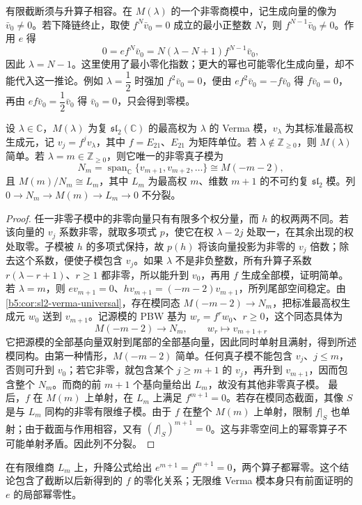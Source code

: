 \ProseParagraphBreak
有限截断须与升算子相容。在 \(M(\lambda)\) 的一个非零商模中，记生成向量的像为 \(\bar v_0\ne0\)。若下降链终止，取使 \(f^N\bar v_0=0\) 成立的最小正整数 \(N\)，则 \(f^{N-1}\bar v_0\ne0\)。作用 \(e\) 得
\[
	0=ef^N\bar v_0=N(\lambda-N+1)f^{N-1}\bar v_0,
\]
因此 \(\lambda=N-1\)。这里使用了最小零化指数；更大的幂也可能零化生成向量，却不能代入这一推论。例如 \(\lambda=\dfrac12\) 时强加 \(f^2\bar v_0=0\)，便由 \(ef^2\bar v_0=-f\bar v_0\) 得 \(f\bar v_0=0\)，再由 \(ef\bar v_0=\dfrac12\bar v_0\) 得 \(\bar v_0=0\)，只会得到零模。

\begin{theorem}\label{b5:thm:sl2-verma-submodules}
	设 \(\lambda\in\mathbb C\)，\(M(\lambda)\) 为复 \(\mathfrak{sl}_2(\mathbb C)\) 的最高权为 \(\lambda\) 的 Verma 模，\(v_\lambda\) 为其标准最高权生成元，记 \(v_j=f^jv_\lambda\)，其中 \(f=E_{21}\)、\(E_{21}\) 为矩阵单位。若 \(\lambda\notin\mathbb Z_{\ge0}\)，则 \(M(\lambda)\) 简单。若 \(\lambda=m\in\mathbb Z_{\ge0}\)，则它唯一的非零真子模为
	\[
		N_m=\operatorname{span}_{\mathbb C}\{v_{m+1},v_{m+2},\ldots\} \cong M(-m-2),
	\]
	且 \(M(m)/N_m\cong L_m\)，其中 \(L_m\) 为最高权 \(m\)、维数 \(m+1\) 的不可约复 \(\mathfrak{sl}_2\) 模。列 \(0\to N_m\to M(m)\to L_m\to0\) 不分裂。
\end{theorem}
\begin{proof}
	任一非零子模中的非零向量只有有限多个权分量，而 \(h\) 的权两两不同。若该向量的 \(v_j\) 系数非零，就取多项式 \(p\)，使它在权 \(\lambda-2j\) 处取一，在其余出现的权处取零。子模被 \(h\) 的多项式保持，故 \(p(h)\) 将该向量投影为非零的 \(v_j\) 倍数；除去这个系数，便使子模包含 \(v_j\)。如果 \(\lambda\) 不是非负整数，所有升算子系数 \(r(\lambda-r+1)\)、\(r\ge1\) 都非零，所以能升到 \(v_0\)，再用 \(f\) 生成全部模，证明简单。 若 \(\lambda=m\)，则 \(ev_{m+1}=0\)、\(hv_{m+1}=(-m-2)v_{m+1}\)，所列尾部空间稳定。由\cref{b5:cor:sl2-verma-universal}，存在模同态 \(M(-m-2)\to N_m\)，把标准最高权生成元 \(w_0\) 送到 \(v_{m+1}\)。记源模的 PBW 基为 \(w_r=f^rw_0\)、\(r\ge0\)，这个同态具体为
	\[
		M(-m-2)\longrightarrow N_m,\qquad w_r\longmapsto v_{m+1+r}
	\]
	它把源模的全部基向量双射到尾部的全部基向量，因此同时单射且满射，得到所述模同构。由第一种情形，\(M(-m-2)\) 简单。任何真子模不能包含 \(v_j\)、\(j\le m\)，否则可升到 \(v_0\)；若它非零，就包含某个 \(j\ge m+1\) 的 \(v_j\)，再升到 \(v_{m+1}\)，因而包含整个 \(N_m\)。而商的前 \(m+1\) 个基向量给出 \(L_m\)，故没有其他非零真子模。 最后，\(f\) 在 \(M(m)\) 上单射，在 \(L_m\) 上满足 \(f^{m+1}=0\)。若存在模同态截面，其像 \(S\) 是与 \(L_m\) 同构的非零有限维子模。由于 \(f\) 在整个 \(M(m)\) 上单射，限制 \(f|_S\) 也单射；由于截面与作用相容，又有 \((f|_S)^{m+1}=0\)。这与非零空间上的幂零算子不可能单射矛盾。因此列不分裂。
\end{proof}
在有限维商 \(L_m\) 上，升降公式给出 \(e^{m+1}=f^{m+1}=0\)，两个算子都幂零。这个结论包含了截断以后新得到的 \(f\) 的零化关系；无限维 Verma 模本身只有前面证明的 \(e\) 的局部幂零性。

